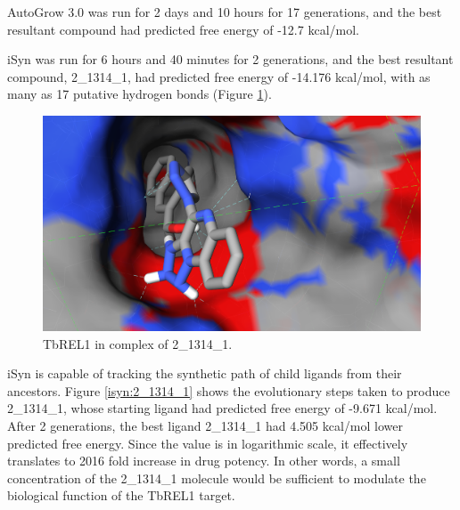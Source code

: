 AutoGrow 3.0 was run for 2 days and 10 hours for 17 generations, and the best resultant compound had predicted free energy of -12.7 kcal/mol.

iSyn was run for 6 hours and 40 minutes for 2 generations, and the best resultant compound, 2\_1314\_1, had predicted free energy of -14.176 kcal/mol, with as many as 17 putative hydrogen bonds (Figure \ref{isyn:1XDN}).

\begin{figure}
\begin{center}
\includegraphics[width=\linewidth]{../isyn/1XDN.png}
\end{center}
\caption{TbREL1 in complex of 2\_1314\_1.}
\label{isyn:1XDN}
\end{figure}

iSyn is capable of tracking the synthetic path of child ligands from their ancestors. Figure \ref{isyn:2_1314_1} shows the evolutionary steps taken to produce 2\_1314\_1, whose starting ligand had predicted free energy of -9.671 kcal/mol. After 2 generations, the best ligand 2\_1314\_1 had 4.505 kcal/mol lower predicted free energy. Since the value is in logarithmic scale, it effectively translates to 2016 fold increase in drug potency. In other words, a small concentration of the 2\_1314\_1 molecule would be sufficient to modulate the biological function of the TbREL1 target.

